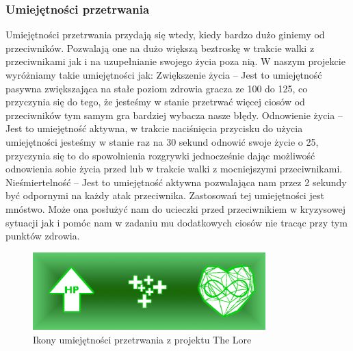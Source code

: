 \documentclass[oneside,polski,logo]{amuthesis}
\begin{document}
\subsubsection{Umiejętności przetrwania}
Umiejętności przetrwania przydają się wtedy, kiedy bardzo dużo giniemy od przeciwników. Pozwalają one na dużo większą beztroskę w trakcie walki z przeciwnikami jak i na uzupełnianie swojego życia poza nią. W naszym projekcie wyróżniamy takie umiejętności jak:
Zwiększenie życia – Jest to umiejętność pasywna zwiększająca na stałe poziom zdrowia gracza ze 100 do 125, co przyczynia się do tego, że jesteśmy w stanie przetrwać więcej ciosów od przeciwników tym samym gra bardziej wybacza nasze błędy.
Odnowienie życia – Jest to umiejętność aktywna, w trakcie naciśnięcia przycisku do użycia umiejętności jesteśmy w stanie raz na 30 sekund odnowić swoje życie o 25, przyczynia się to do spowolnienia rozgrywki jednocześnie dając możliwość odnowienia sobie życia przed lub w trakcie walki z mocniejszymi przeciwnikami.
Nieśmiertelność – Jest to umiejętność aktywna pozwalająca nam przez 2 sekundy być odpornymi na każdy atak przeciwnika. Zastosowań tej umiejętności jest mnóstwo. Może ona posłużyć nam do ucieczki przed przeciwnikiem w kryzysowej sytuacji jak i pomóc nam w zadaniu mu dodatkowych ciosów nie tracąc przy tym punktów zdrowia. 

\begin{figure}[h]
	\centering
	\includegraphics[width=9cm]{images/kozubal/patience.png}
	\caption{Ikony umiejętności przetrwania z projektu The Lore}
\end{figure}
\end{document}
